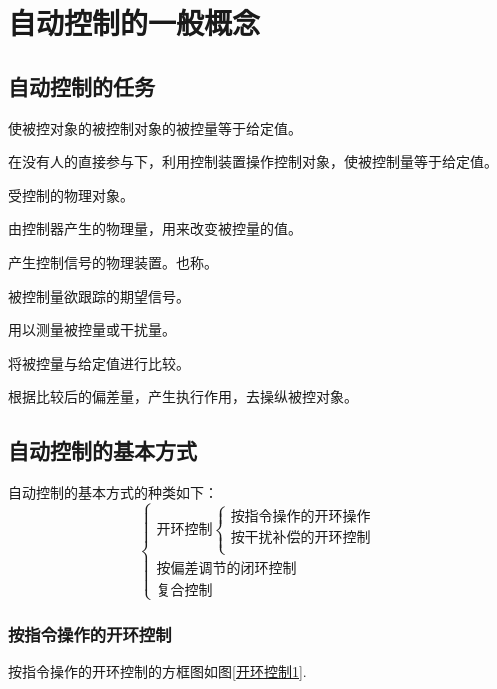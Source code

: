 \chapter{自动控制的一般概念}
\thispagestyle{empty}
\section{自动控制的任务}
使被控对象的被控制对象的被控量等于给定值。

在没有人的直接参与下，利用控制装置操作控制对象，使被控制量等于给定值。

 受控制的物理对象。

 由控制器产生的物理量，用来改变被控量的值。

 产生控制信号的物理装置。也称。

 被控制量欲跟踪的期望信号。

 用以测量被控量或干扰量。

 将被控量与给定值进行比较。

 根据比较后的偏差量，产生执行作用，去操纵被控对象。

\section{自动控制的基本方式}
自动控制的基本方式的种类如下：
\begin{equation*}
	\begin{cases}
		\mbox{开环控制}
		\begin{cases}
			\mbox{按指令操作的开环操作}\\
			\mbox{按干扰补偿的开环控制}\\
		\end{cases}
		\\
		\mbox{按偏差调节的闭环控制}\\
		\mbox{复合控制}
	\end{cases}
\end{equation*}

\subsection{按指令操作的开环控制}

按指令操作的开环控制的方框图如图\ref{开环控制1}.

